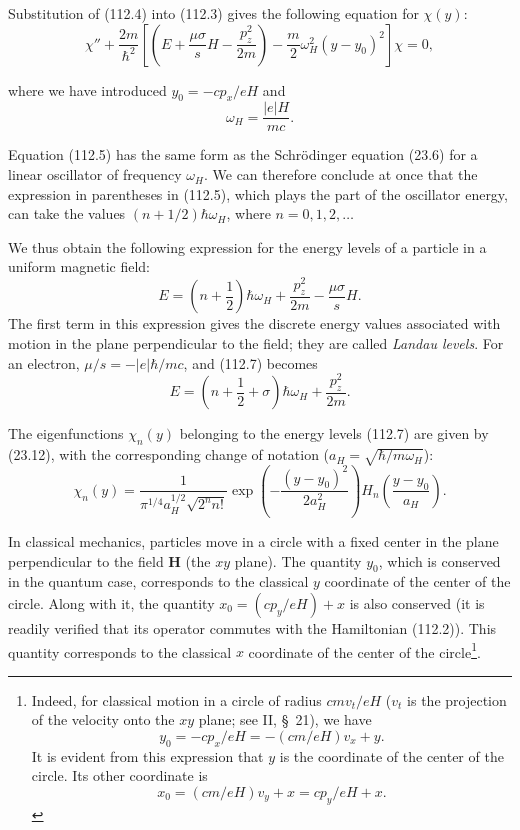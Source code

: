 Substitution of (112.4) into (112.3) gives the following equation for $\chi(y)$:
\begin{equation}
 \chi''+\frac{2m}{\hbar^2}\left[\left(E+\frac{\mu\sigma}{s}H-\frac{p_z^2}{2m}\right)-\frac m2\omega_H^2(y-y_0)^2\right]\chi=0,
 \tag{112.5}
\end{equation}

where we have introduced $y_0=-cp_x/eH$ and
\begin{equation}
 \omega_H=\frac{|e|H}{mc}.
 \tag{112.6}
\end{equation}

Equation (112.5) has the same form as the Schrödinger equation (23.6) for a linear oscillator of frequency $\omega_H$. We can therefore conclude at once that the expression in parentheses in (112.5), which plays the part of the oscillator energy, can take the values $(n+1/2)\hbar\omega_H$, where $n=0,1,2,\ldots$

We thus obtain the following expression for the energy levels of a particle in a uniform magnetic field:
\begin{equation}
 E=\left(n+\frac12\right)\hbar\omega_H+\frac{p_z^2}{2m}-\frac{\mu\sigma}{s}H.
 \tag{112.7}
\end{equation}
The first term in this expression gives the discrete energy values associated with motion in the plane perpendicular to the field; they are called \emph{Landau levels}. For an electron, $\mu/s=-|e|\hbar/mc$, and (112.7) becomes
\begin{equation}
 E=\left(n+\frac12+\sigma\right)\hbar\omega_H+\frac{p_z^2}{2m}.
 \tag{112.8}
\end{equation}

The eigenfunctions $\chi_n(y)$ belonging to the energy levels (112.7) are given by (23.12), with the corresponding change of notation ($a_H=\sqrt{\hbar/m\omega_H}$):
\begin{equation}
 \chi_n(y)=\frac1{\pi^{1/4}a_H^{1/2}\sqrt{2^nn!}}\exp\left(-\frac{(y-y_0)^2}{2a_H^2}\right)H_n\left(\frac{y-y_0}{a_H}\right).
 \tag{112.9}
\end{equation}

In classical mechanics, particles move in a circle with a fixed center in the plane perpendicular to the field $\mathbf H$ (the $xy$ plane). The quantity $y_0$, which is conserved in the quantum case, corresponds to the classical $y$ coordinate of the center of the circle. Along with it, the quantity $x_0=(cp_y/eH)+x$ is also conserved (it is readily verified that its operator commutes with the Hamiltonian (112.2)). This quantity corresponds to the classical $x$ coordinate of the center of the circle\footnote{Indeed, for classical motion in a circle of radius $cmv_t/eH$ ($v_t$ is the projection of the velocity onto the $xy$ plane; see II, \S~21), we have
\[
 y_0=-cp_x/eH=-(cm/eH)v_x+y.
\]
It is evident from this expression that $y$ is the coordinate of the center of the circle. Its other coordinate is
\[
 x_0=(cm/eH)v_y+x=cp_y/eH+x.
\]}. 


